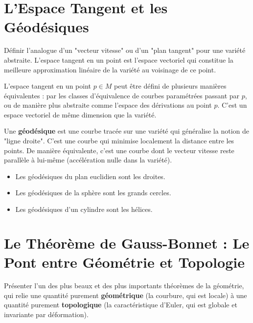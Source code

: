 \section{L'Espace Tangent et les Géodésiques}

\begin{objectif}
    Définir l'analogue d'un "vecteur vitesse" ou d'un "plan tangent" pour une variété abstraite. L'espace tangent en un point est l'espace vectoriel qui constitue la meilleure approximation linéaire de la variété au voisinage de ce point.
\end{objectif}

\begin{definition}
    L'espace tangent en un point $p \in M$ peut être défini de plusieurs manières équivalentes : par les classes d'équivalence de courbes paramétrées passant par $p$, ou de manière plus abstraite comme l'espace des dérivations au point $p$. C'est un espace vectoriel de même dimension que la variété.
\end{definition}

\begin{definition}[Géodésique]
    Une \textbf{géodésique} est une courbe tracée sur une variété qui généralise la notion de "ligne droite". C'est une courbe qui minimise localement la distance entre les points. De manière équivalente, c'est une courbe dont le vecteur vitesse reste parallèle à lui-même (accélération nulle dans la variété).
\end{definition}

\begin{example}
    \begin{itemize}
        \item Les géodésiques du plan euclidien sont les droites.
        \item Les géodésiques de la sphère sont les grands cercles.
        \item Les géodésiques d'un cylindre sont les hélices.
    \end{itemize}
\end{example}

\section{Le Théorème de Gauss-Bonnet : Le Pont entre Géométrie et Topologie}

\begin{objectif}
    Présenter l'un des plus beaux et des plus importants théorèmes de la géométrie, qui relie une quantité purement \textbf{géométrique} (la courbure, qui est locale) à une quantité purement \textbf{topologique} (la caractéristique d'Euler, qui est globale et invariante par déformation).
\end{objectif}

